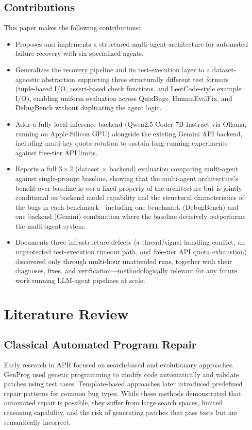 \documentclass[conference]{IEEEtran}
\begin{document}
\subsection{Contributions}
This paper makes the following contributions:
\begin{itemize}
    \item Proposes and implements a structured multi-agent architecture for automated failure recovery with six specialized agents.
    \item Generalizes the recovery pipeline and its test-execution layer to a dataset-agnostic abstraction supporting three structurally different test formats (tuple-based I/O, assert-based check functions, and LeetCode-style example I/O), enabling uniform evaluation across QuixBugs, HumanEvalFix, and DebugBench without duplicating the agent logic.
    \item Adds a fully local inference backend (Qwen2.5-Coder 7B Instruct via Ollama, running on Apple Silicon GPU) alongside the existing Gemini API backend, including multi-key quota-rotation to sustain long-running experiments against free-tier API limits.
    \item Reports a full $3 \times 2$ (dataset $\times$ backend) evaluation comparing multi-agent against single-prompt baseline, showing that the multi-agent architecture's benefit over baseline is \emph{not} a fixed property of the architecture but is jointly conditional on backend model capability and the structural characteristics of the bugs in each benchmark---including one benchmark (DebugBench) and one backend (Gemini) combination where the baseline decisively outperforms the multi-agent system.
    \item Documents three infrastructure defects (a thread/signal-handling conflict, an unprotected test-execution timeout path, and free-tier API quota exhaustion) discovered only through multi-hour unattended runs, together with their diagnoses, fixes, and verification---methodologically relevant for any future work running LLM-agent pipelines at scale.
\end{itemize}

\section{Literature Review}

\subsection{Classical Automated Program Repair}
Early research in APR focused on search-based and evolutionary approaches. GenProg \cite{genprog} used genetic programming to modify code automatically and validate patches using test cases. Template-based approaches \cite{templateapr} later introduced predefined repair patterns for common bug types. While these methods demonstrated that automated repair is possible, they suffer from large search spaces, limited reasoning capability, and the risk of generating patches that pass tests but are semantically incorrect.
\end{document}
